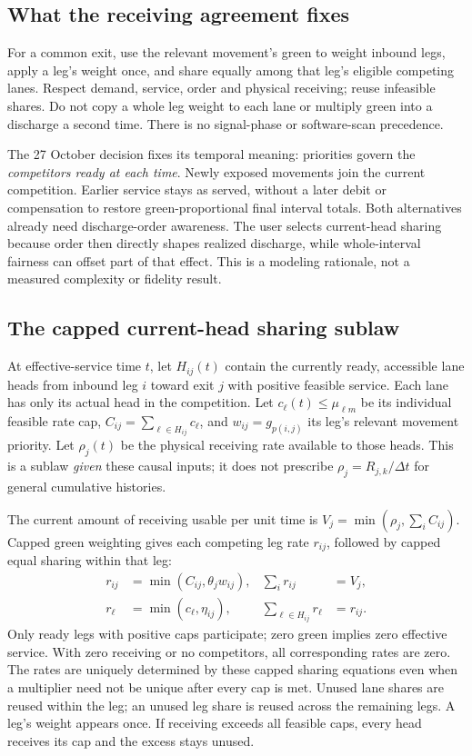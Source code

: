 \documentclass[11pt]{article}
\begin{document}
\subsection*{What the receiving agreement fixes}

For a common exit, use the relevant movement's green to weight inbound legs, apply a leg's weight once, and share equally among that leg's eligible competing lanes. Respect demand, service, order and physical receiving; reuse infeasible shares. Do not copy a whole leg weight to each lane or multiply green into a discharge a second time. There is no signal-phase or software-scan precedence.

The 27 October decision fixes its temporal meaning: priorities govern the \emph{competitors ready at each time}. Newly exposed movements join the current competition. Earlier service stays as served, without a later debit or compensation to restore green-proportional final interval totals. Both alternatives already need discharge-order awareness. The user selects current-head sharing because order then directly shapes realized discharge, while whole-interval fairness can offset part of that effect. This is a modeling rationale, not a measured complexity or fidelity result.

\subsection*{The capped current-head sharing sublaw}

At effective-service time $t$, let $H_{ij}(t)$ contain the currently ready, accessible lane heads from inbound leg $i$ toward exit $j$ with positive feasible service. Each lane has only its actual head in the competition. Let $c_\ell(t)\leq\mu_{\ell m}$ be its individual feasible rate cap, $C_{ij}=\sum_{\ell\in H_{ij}}c_\ell$, and $w_{ij}=g_{p(i,j)}$ its leg's relevant movement priority. Let $\rho_j(t)$ be the physical receiving rate available to those heads. This is a sublaw \emph{given} these causal inputs; it does not prescribe $\rho_j=R_{j,k}/\Delta t$ for general cumulative histories.

The current amount of receiving usable per unit time is $V_j=\min(\rho_j,\sum_i C_{ij})$. Capped green weighting gives each competing leg rate $r_{ij}$, followed by capped equal sharing within that leg:
\begin{align}
 r_{ij}&=\min(C_{ij},\theta_j w_{ij}),&
 \sum_i r_{ij}&=V_j,\label{eq:ready-leg-sharing}\\
 r_\ell&=\min(c_\ell,\eta_{ij}),&
 \sum_{\ell\in H_{ij}}r_\ell&=r_{ij}.
 \label{eq:ready-lane-sharing}
\end{align}
Only ready legs with positive caps participate; zero green implies zero effective service. With zero receiving or no competitors, all corresponding rates are zero. The rates are uniquely determined by these capped sharing equations even when a multiplier need not be unique after every cap is met. Unused lane shares are reused within the leg; an unused leg share is reused across the remaining legs. A leg's weight appears once. If receiving exceeds all feasible caps, every head receives its cap and the excess stays unused.
\end{document}
